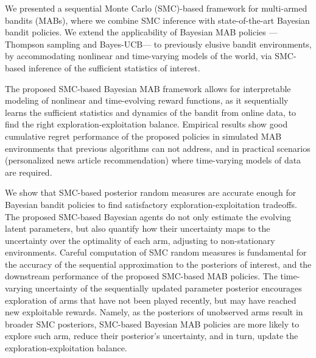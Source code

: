 We presented a sequential Monte Carlo (SMC)-based framework for multi-armed bandits (MABs),
where we combine SMC inference with state-of-the-art Bayesian bandit policies.
We extend the applicability of Bayesian MAB policies ---Thompson sampling and Bayes-UCB---
to previously elusive bandit environments,
by accommodating nonlinear and time-varying models of the world,
via SMC-based inference of the sufficient statistics of interest.

The proposed SMC-based Bayesian MAB framework allows for interpretable modeling of nonlinear and time-evolving reward functions,
as it sequentially learns the sufficient statistics and dynamics of the bandit from online data,
to find the right exploration-exploitation balance.
%
Empirical results show good cumulative regret performance of the proposed policies
in simulated MAB environments that previous algorithms can not address,
and in practical scenarios (personalized news article recommendation)
where time-varying models of data are required.

We show that SMC-based posterior random measures 
are accurate enough for Bayesian bandit policies to find satisfactory exploration-exploitation tradeoffs.
The proposed SMC-based Bayesian agents do not only estimate the evolving latent parameters,
but also quantify how their uncertainty maps to the uncertainty over the optimality of each arm,
adjusting to non-stationary environments.
%
Careful computation of SMC random measures
is fundamental for the accuracy of the sequential approximation to the posteriors of interest,
and the downstream performance of the proposed SMC-based MAB policies.
The time-varying uncertainty of the sequentially updated parameter posterior encourages exploration of arms
that have not been played recently, but may have reached new exploitable rewards.
Namely, as the posteriors of unobserved arms %
result in broader SMC posteriors,
SMC-based Bayesian MAB policies are more likely to explore such arm,
reduce their posterior's uncertainty, and in turn, update the exploration-exploitation balance.

